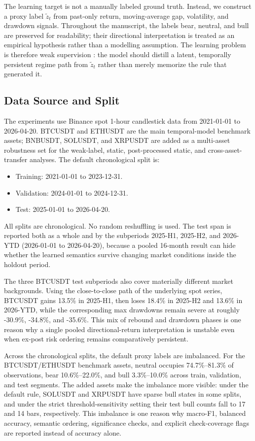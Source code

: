 \documentclass[a4paper,fleqn]{cas-dc}
\begin{document}
The learning target is not a manually labeled ground truth. Instead, we construct a proxy label $\tilde{z}_t$ from past-only return, moving-average gap, volatility, and drawdown signals. Throughout the manuscript, the labels bear, neutral, and bull are preserved for readability; their directional interpretation is treated as an empirical hypothesis rather than a modelling assumption. The learning problem is therefore weak supervision \cite{zhou2018weakly,ratner2020snorkel,zhang2022programmatic}: the model should distill a latent, temporally persistent regime path from $\tilde{z}_t$ rather than merely memorize the rule that generated it.

\subsection{Data Source and Split}
The experiments use Binance spot 1-hour candlestick data from 2021-01-01 to 2026-04-20. BTCUSDT and ETHUSDT are the main temporal-model benchmark assets; BNBUSDT, SOLUSDT, and XRPUSDT are added as a multi-asset robustness set for the weak-label, static, post-processed static, and cross-asset-transfer analyses. The default chronological split is:
\begin{itemize}
\item Training: 2021-01-01 to 2023-12-31.
\item Validation: 2024-01-01 to 2024-12-31.
\item Test: 2025-01-01 to 2026-04-20.
\end{itemize}

All splits are chronological. No random reshuffling is used. The test span is reported both as a whole and by the subperiods 2025-H1, 2025-H2, and 2026-YTD (2026-01-01 to 2026-04-20), because a pooled 16-month result can hide whether the learned semantics survive changing market conditions inside the holdout period.

The three BTCUSDT test subperiods also cover materially different market backgrounds. Using the close-to-close path of the underlying spot series, BTCUSDT gains 13.5\% in 2025-H1, then loses 18.4\% in 2025-H2 and 13.6\% in 2026-YTD, while the corresponding max drawdowns remain severe at roughly -30.9\%, -34.8\%, and -35.6\%. This mix of rebound and drawdown phases is one reason why a single pooled directional-return interpretation is unstable even when ex-post risk ordering remains comparatively persistent.

Across the chronological splits, the default proxy labels are imbalanced. For the BTCUSDT/ETHUSDT benchmark assets, neutral occupies 74.7\%--81.3\% of observations, bear 10.6\%--22.0\%, and bull 3.3\%--10.0\% across train, validation, and test segments. The added assets make the imbalance more visible: under the default rule, SOLUSDT and XRPUSDT have sparse bull states in some splits, and under the strict threshold-sensitivity setting their test bull counts fall to 17 and 14 bars, respectively. This imbalance is one reason why macro-F1, balanced accuracy, semantic ordering, significance checks, and explicit check-coverage flags are reported instead of accuracy alone.
\end{document}
